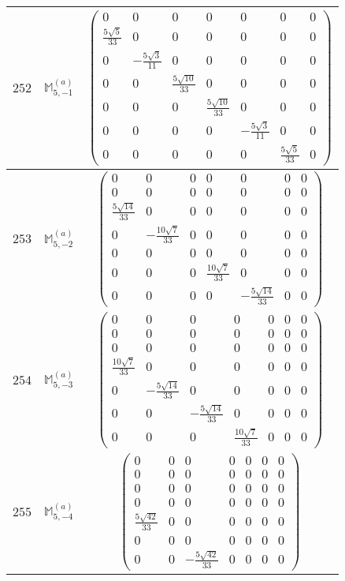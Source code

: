 \documentclass[fleqn,8pt,landscape]{jsarticle}
\begin{document}
\begin{center}
\begin{longtable}{ccc}
$ 252 $ & $ \mathbb{M}_{5,-1}^{(a)} $ & $ \begin{pmatrix} 0 & 0 & 0 & 0 & 0 & 0 & 0 \\ \frac{5 \sqrt{5}}{33} & 0 & 0 & 0 & 0 & 0 & 0 \\ 0 & - \frac{5 \sqrt{3}}{11} & 0 & 0 & 0 & 0 & 0 \\ 0 & 0 & \frac{5 \sqrt{10}}{33} & 0 & 0 & 0 & 0 \\ 0 & 0 & 0 & \frac{5 \sqrt{10}}{33} & 0 & 0 & 0 \\ 0 & 0 & 0 & 0 & - \frac{5 \sqrt{3}}{11} & 0 & 0 \\ 0 & 0 & 0 & 0 & 0 & \frac{5 \sqrt{5}}{33} & 0 \end{pmatrix} $ \\ \hline
$ 253 $ & $ \mathbb{M}_{5,-2}^{(a)} $ & $ \begin{pmatrix} 0 & 0 & 0 & 0 & 0 & 0 & 0 \\ 0 & 0 & 0 & 0 & 0 & 0 & 0 \\ \frac{5 \sqrt{14}}{33} & 0 & 0 & 0 & 0 & 0 & 0 \\ 0 & - \frac{10 \sqrt{7}}{33} & 0 & 0 & 0 & 0 & 0 \\ 0 & 0 & 0 & 0 & 0 & 0 & 0 \\ 0 & 0 & 0 & \frac{10 \sqrt{7}}{33} & 0 & 0 & 0 \\ 0 & 0 & 0 & 0 & - \frac{5 \sqrt{14}}{33} & 0 & 0 \end{pmatrix} $ \\ \hline
$ 254 $ & $ \mathbb{M}_{5,-3}^{(a)} $ & $ \begin{pmatrix} 0 & 0 & 0 & 0 & 0 & 0 & 0 \\ 0 & 0 & 0 & 0 & 0 & 0 & 0 \\ 0 & 0 & 0 & 0 & 0 & 0 & 0 \\ \frac{10 \sqrt{7}}{33} & 0 & 0 & 0 & 0 & 0 & 0 \\ 0 & - \frac{5 \sqrt{14}}{33} & 0 & 0 & 0 & 0 & 0 \\ 0 & 0 & - \frac{5 \sqrt{14}}{33} & 0 & 0 & 0 & 0 \\ 0 & 0 & 0 & \frac{10 \sqrt{7}}{33} & 0 & 0 & 0 \end{pmatrix} $ \\ \hline
$ 255 $ & $ \mathbb{M}_{5,-4}^{(a)} $ & $ \begin{pmatrix} 0 & 0 & 0 & 0 & 0 & 0 & 0 \\ 0 & 0 & 0 & 0 & 0 & 0 & 0 \\ 0 & 0 & 0 & 0 & 0 & 0 & 0 \\ 0 & 0 & 0 & 0 & 0 & 0 & 0 \\ \frac{5 \sqrt{42}}{33} & 0 & 0 & 0 & 0 & 0 & 0 \\ 0 & 0 & 0 & 0 & 0 & 0 & 0 \\ 0 & 0 & - \frac{5 \sqrt{42}}{33} & 0 & 0 & 0 & 0 \end{pmatrix} $ \\ \hline

\end{longtable}
\end{center}
\end{document}
